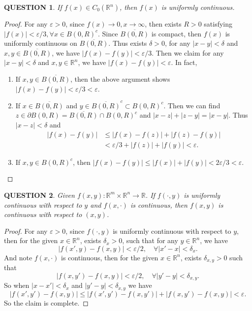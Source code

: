 \documentclass[12pt]{article}
\renewcommand{\(}{\left(}%
\renewcommand{\)}{\right)}%
\renewcommand{\[}{\left[}%
\renewcommand{\]}{\right]}%
\renewcommand{\r}{\mathbb{R}}
\newtheorem{question}{QUESTION}[section]}
\newtheorem{proof}{Proof.}}
\begin{document}
  \begin{question}
  	If $f(x)\in C_0(\r^n)$, then $f(x)$ is uniformly continuous.
  \end{question}
  \begin{proof}
  	For any $\varepsilon>0$, since $f(x)\to0,x\to\infty$, then exists $R>0$ satisfying $|f(x)|<\varepsilon/3,\forall x\in B(0,R)^c$. Since $\overline{ B(0,R)}$ is compact, then $f(x)$ is uniformly continuous on $\overline{ B(0,R)}$. Thus exists $\delta>0$, for any $|x-y|<\delta$ and $x,y\in \overline{ B(0,R)}$, we have $|f(x)-f(y)|<\varepsilon/3$. Then we claim for any $|x-y|<\delta$ and $x,y\in\r^n$, we have $|f(x)-f(y)|<\varepsilon$. In fact,
  	\begin{enumerate}
  		\item If $x,y\in \overline{ B(0,R)}$, then the above argument shows $|f(x)-f(y)|<\varepsilon/3<\varepsilon$.
  		\item If $x\in \overline{ B(0,R)}$ and $y\in \overline{ B(0,R)}^c\subset B(0,R)^c$. Then we can find $z\in \partial B(0,R)=\overline{ B(0,R)}\cap B(0,R)^c$ and $|x-z|+|z-y|=|x-y|$. Thus $|x-z|<\delta$ and
  		\begin{equation*}
  			\begin{split}
  				|f(x)-f(y)|&\leq |f(x)-f(z)|+|f(z)-f(y)|\\
  				&< \varepsilon/3 +|f(z)|+|f(y)|<\varepsilon.
  			\end{split}
  		\end{equation*} 
  		\item If $x,y \in B(0,R)^c$, then $|f(x)-f(y)|\leq |f(x)|+|f(y)|<2\varepsilon/3<\varepsilon$.
  	\end{enumerate}
  \end{proof}
  
  \begin{question}
  	Given $f(x,y):\r^m\times\r^n\to\r$. If $f(\cdot,y)$ is uniformly continuous with respect to $y$ and $f(x,\cdot)$ is continuous, then $f(x,y)$ is continuous with respect to $(x,y)$.
  \end{question}
  \begin{proof}
  	For any $\varepsilon>0$, since $f(\cdot,y)$ is uniformly continuous with respect to $y$, then for the given $x\in\r^n$, exists $\delta_x>0$, such that for any $y\in\r^n$, we have 
  	\begin{equation*}
  		|f(x',y)-f(x,y)|<\varepsilon/2,\quad \forall |x'-x|<\delta_x.
  	\end{equation*}
  	And note $f(x,\cdot)$ is continuous, then for the given $x\in\r^n$, exists $\delta_{x,y}>0$ such that 
  	\begin{equation*}
  		|f(x,y')-f(x,y)|<\varepsilon/2,\quad \forall |y'-y|<\delta_{x,y}.
  	\end{equation*}
  	So when $|x-x'|<\delta_x$ and $|y'-y|<\delta_{x,y}$ we have
  	\begin{equation*}
  		|f(x',y')-f(x,y)|\leq |f(x',y')-f(x,y')|+|f(x,y')-f(x,y)|<\varepsilon.
  	\end{equation*}
  	So the claim is complete.
  \end{proof}
  
\end{document}
